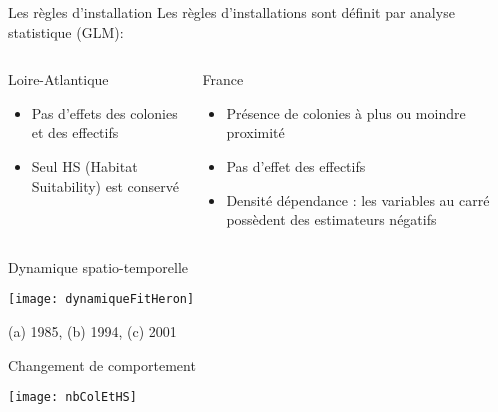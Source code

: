 \documentclass[]{beamer}
\begin{document}
\begin{frame}{Les règles d’installation}
  Les règles d'installations sont définit par analyse statistique (GLM): 
  \begin{columns}
    \begin{column}[c]{0.5\textwidth}
      \begin{block}{Loire-Atlantique}
        \begin{itemize}
        \item Pas d'effets des colonies et des effectifs
        \item Seul HS (Habitat Suitability) est conservé 
        \end{itemize}
      \end{block}

    \end{column}
    \begin{column}[c]{0.5\textwidth}
      \begin{block}{France}
        \begin{itemize}
        \item Présence de colonies à plus ou moindre proximité 
        \item Pas d'effet des effectifs
        \item Densité dépendance : les variables au carré possèdent des estimateurs négatifs
        \end{itemize}

      \end{block}
    \end{column}
  \end{columns}

  
\end{frame}



\begin{frame}{Dynamique spatio-temporelle}
  \begin{center}
    \texttt{[image: dynamiqueFitHeron]}

    (a) 1985, (b) 1994, (c) 2001
  \end{center}
\end{frame}

\begin{frame}{Changement de comportement}
  \begin{center}
    \texttt{[image: nbColEtHS]}

  \end{center}

\end{frame}
\end{document}
